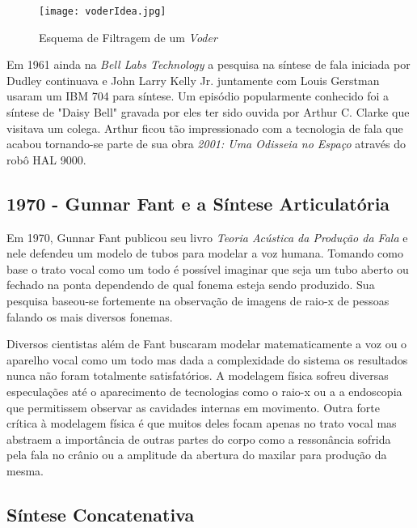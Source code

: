 \begin{figure}
    \centering
    \texttt{[image: voderIdea.jpg]}
    \caption{Esquema de Filtragem de um \textit{Voder}}
    \label{fig:voderIdea}
\end{figure}


Em 1961 ainda na \textit{Bell Labs Technology} a pesquisa na síntese de fala iniciada por Dudley continuava e John Larry Kelly Jr. juntamente com Louis Gerstman usaram um IBM 704 para síntese. Um episódio popularmente conhecido foi a síntese de "Daisy Bell" gravada por eles ter sido ouvida por Arthur C. Clarke que visitava um colega. Arthur ficou tão impressionado com a tecnologia de fala que acabou tornando-se parte de sua obra \emph{2001: Uma Odisseia no Espaço} através do robô HAL 9000.

\subsection{1970 - Gunnar Fant e a Síntese Articulatória}
Em 1970, Gunnar Fant publicou seu livro \textit{Teoria Acústica da Produção da Fala} \cite{fant1960acoustic} e nele defendeu um modelo de tubos para modelar a voz humana. Tomando como base o trato vocal como um todo é possível imaginar que seja um tubo aberto ou fechado na ponta dependendo de qual fonema esteja sendo produzido. Sua pesquisa baseou-se fortemente na observação de imagens de raio-x de pessoas falando os mais diversos fonemas.

Diversos cientistas além de Fant buscaram modelar matematicamente a voz ou o aparelho vocal como um todo mas dada a complexidade do sistema os resultados nunca não foram totalmente satisfatórios. A modelagem física sofreu diversas especulações até o aparecimento de tecnologias como o raio-x ou a a endoscopia que permitissem observar as cavidades internas em movimento. Outra forte crítica à modelagem física é que muitos deles focam apenas no trato vocal mas abstraem a importância de outras partes do corpo como a ressonância sofrida pela fala no crânio ou a amplitude da abertura do maxilar para produção da mesma.

\subsection{Síntese Concatenativa}

